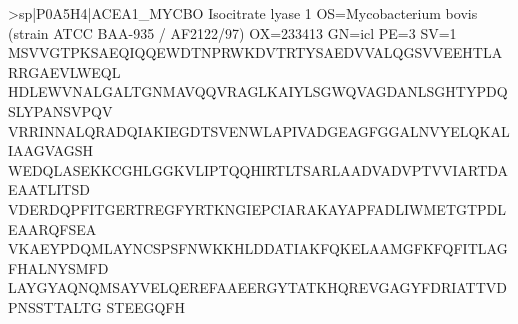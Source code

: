 >sp|P0A5H4|ACEA1_MYCBO Isocitrate lyase 1 OS=Mycobacterium bovis (strain ATCC BAA-935 / AF2122/97) OX=233413 GN=icl PE=3 SV=1
MSVVGTPKSAEQIQQEWDTNPRWKDVTRTYSAEDVVALQGSVVEEHTLARRGAEVLWEQL
HDLEWVNALGALTGNMAVQQVRAGLKAIYLSGWQVAGDANLSGHTYPDQSLYPANSVPQV
VRRINNALQRADQIAKIEGDTSVENWLAPIVADGEAGFGGALNVYELQKALIAAGVAGSH
WEDQLASEKKCGHLGGKVLIPTQQHIRTLTSARLAADVADVPTVVIARTDAEAATLITSD
VDERDQPFITGERTREGFYRTKNGIEPCIARAKAYAPFADLIWMETGTPDLEAARQFSEA
VKAEYPDQMLAYNCSPSFNWKKHLDDATIAKFQKELAAMGFKFQFITLAGFHALNYSMFD
LAYGYAQNQMSAYVELQEREFAAEERGYTATKHQREVGAGYFDRIATTVDPNSSTTALTG
STEEGQFH